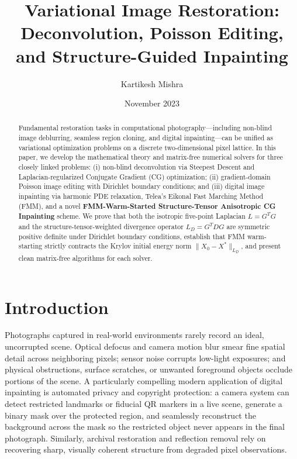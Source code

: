 \documentclass{amsart}
\title{Variational Image Restoration: Deconvolution, Poisson Editing, and Structure-Guided Inpainting}
\author{Kartikesh Mishra}
\date{November 2023}
\begin{document}
\maketitle

\begin{abstract}
Fundamental restoration tasks in computational photography---including non-blind image deblurring, seamless region cloning, and digital inpainting---can be unified as variational optimization problems on a discrete two-dimensional pixel lattice. In this paper, we develop the mathematical theory and matrix-free numerical solvers for three closely linked problems: (i) non-blind deconvolution via Steepest Descent and Laplacian-regularized Conjugate Gradient (CG) optimization; (ii) gradient-domain Poisson image editing with Dirichlet boundary conditions; and (iii) digital image inpainting via harmonic PDE relaxation, Telea's Eikonal Fast Marching Method (FMM), and a novel \textbf{FMM-Warm-Started Structure-Tensor Anisotropic CG Inpainting} scheme. We prove that both the isotropic five-point Laplacian $L = G^T G$ and the structure-tensor-weighted divergence operator $L_D = G^T D G$ are symmetric positive definite under Dirichlet boundary conditions, establish that FMM warm-starting strictly contracts the Krylov initial energy norm $\|X_0 - X^*\|_{L_D}$, and present clean matrix-free algorithms for each solver.
\end{abstract}

\section{Introduction}\label{sec_intro}

Photographs captured in real-world environments rarely record an ideal, uncorrupted scene. Optical defocus and camera motion blur smear fine spatial detail across neighboring pixels; sensor noise corrupts low-light exposures; and physical obstructions, surface scratches, or unwanted foreground objects occlude portions of the scene. A particularly compelling modern application of digital inpainting is automated privacy and copyright protection: a camera system can detect restricted landmarks or fiducial QR markers in a live scene, generate a binary mask over the protected region, and seamlessly reconstruct the background across the mask so the restricted object never appears in the final photograph. Similarly, archival restoration and reflection removal rely on recovering sharp, visually coherent structure from degraded pixel observations.
\end{document}
